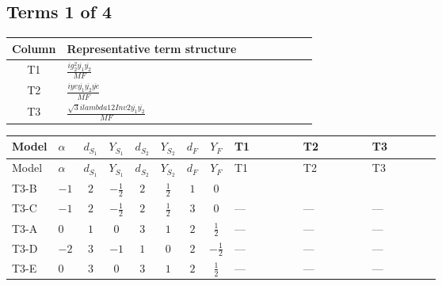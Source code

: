 \documentclass[8pt]{article}
\begin{document}
\begin{landscape}
\subsection*{Terms 1 of 4}
\begin{center}
\begin{tabular}{@{}c >{\raggedright\arraybackslash}p{0.82\linewidth}@{}}
\toprule
Column & Representative term structure \\
\midrule
T1 & \(\displaystyle \frac{i g_{2}^{2} \overline{y_{1}} \overline{y_{2}}}{MF}\) \\
\midrule
T2 & \(\displaystyle \frac{i ye \overline{y_{1}} \overline{y_{2}} \overline{ye}}{MF}\) \\
\midrule
T3 & \(\displaystyle \frac{\sqrt{3} i lambda12Inv2 \overline{y_{1}} \overline{y_{2}}}{MF}\) \\
\midrule
\bottomrule
\end{tabular}
\end{center}
\smallskip
\tiny
\begin{longtable}{@{}llcccccc >{\raggedright\arraybackslash}p{0.21\linewidth} >{\raggedright\arraybackslash}p{0.21\linewidth} >{\raggedright\arraybackslash}p{0.21\linewidth}@{}}
\toprule
Model & $\alpha$ & $d_{S_1}$ & $Y_{S_1}$ & $d_{S_2}$ & $Y_{S_2}$ & $d_F$ & $Y_F$ & T1 & T2 & T3 \\
\midrule
\endfirsthead
\toprule
Model & $\alpha$ & $d_{S_1}$ & $Y_{S_1}$ & $d_{S_2}$ & $Y_{S_2}$ & $d_F$ & $Y_F$ & T1 & T2 & T3 \\
\midrule
\endhead
T3-B & $-1$ & $2$ & $-\frac{1}{2}$ & $2$ & $\frac{1}{2}$ & $1$ & $0$ & \scriptsize\adjustbox{max width=\linewidth}{$\begin{gathered} \frac{3 i g_{2}^{2} \overline{y_{1}} \overline{y_{2}}}{8 MF}\end{gathered}$} & \scriptsize\adjustbox{max width=\linewidth}{$\begin{gathered} - \frac{i ye \overline{y_{1}} \overline{y_{2}} \overline{ye}}{8 MF}\end{gathered}$} & \scriptsize\adjustbox{max width=\linewidth}{$\begin{gathered} \frac{\sqrt{3} i lambda12Inv2 \overline{y_{1}} \overline{y_{2}}}{6 MF}\end{gathered}$} \\
\midrule
T3-C & $-1$ & $2$ & $-\frac{1}{2}$ & $2$ & $\frac{1}{2}$ & $3$ & $0$ & --- & --- & --- \\
\midrule
T3-A & $0$ & $1$ & $0$ & $3$ & $1$ & $2$ & $\frac{1}{2}$ & --- & --- & --- \\
\midrule
T3-D & $-2$ & $3$ & $-1$ & $1$ & $0$ & $2$ & $-\frac{1}{2}$ & --- & --- & --- \\
\midrule
T3-E & $0$ & $3$ & $0$ & $3$ & $1$ & $2$ & $\frac{1}{2}$ & --- & --- & --- \\
\midrule
\bottomrule
\end{longtable}
\clearpage

\end{landscape}
\end{document}

